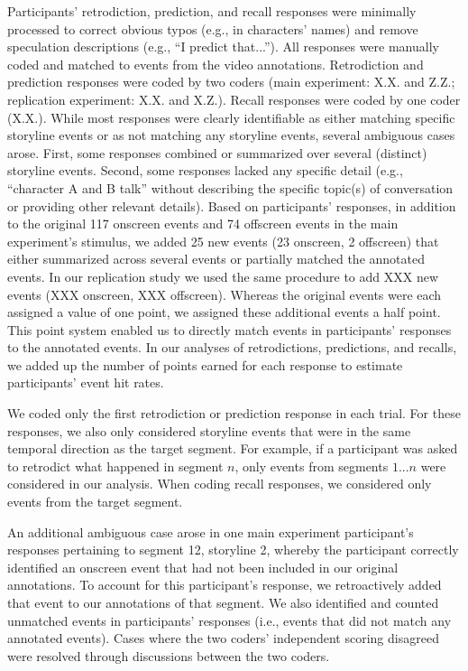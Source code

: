 \documentclass[10pt]{article}
\begin{document}
Participants' retrodiction, prediction, and recall responses were minimally processed to correct obvious typos (e.g., in characters’ names) and remove speculation descriptions (e.g., ``I predict that...''). All responses were manually coded and matched to events from the video annotations. Retrodiction and prediction responses were coded by two coders (main experiment: X.X. and Z.Z.; replication experiment: X.X. and X.Z.). Recall responses were coded by one coder (X.X.). While most responses were clearly identifiable as either matching specific storyline events or as not matching any storyline events, several ambiguous cases arose. First, some responses combined or summarized over several (distinct) storyline events. Second, some responses lacked any specific detail (e.g., ``character A and B talk'' without describing the specific topic(s) of conversation or providing other relevant details). Based on participants' responses, in addition to the original 117 onscreen events and 74 offscreen events in the main experiment's stimulus, we added 25 new events (23 onscreen, 2 offscreen) that either summarized across several events or partially matched the annotated events. In our replication study we used the same procedure to add XXX new events (XXX onscreen, XXX offscreen). Whereas the original events were each assigned a value of one point, we assigned these additional events a half point. This point system enabled us to directly match events in participants' responses to the annotated events. In our analyses of retrodictions, predictions, and recalls, we added up the number of points earned for each response to estimate participants' event hit rates.

We coded only the first retrodiction or prediction response in each trial. For these responses, we also only considered storyline events that were in the same temporal direction as the target segment. For example, if a participant was asked to retrodict what happened in segment $n$, only events from segments $1...n$ were considered in our analysis. When coding recall responses, we considered only events from the target segment.

An additional ambiguous case arose in one main experiment participant's responses pertaining to segment 12, storyline 2, whereby the participant correctly identified an onscreen event that had not been included in our original annotations. To account for this participant's response, we retroactively added that event to our annotations of that segment. We also identified and counted unmatched events in participants' responses (i.e., events that did not match any annotated events). Cases where the two coders' independent scoring disagreed were resolved through discussions between the two coders.
\end{document}
